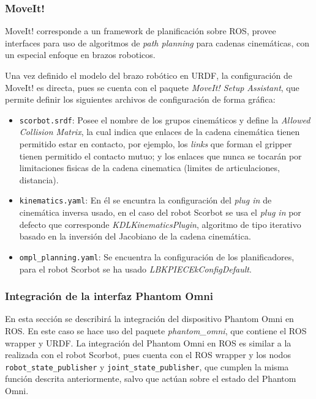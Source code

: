 \subsubsection{MoveIt!}

MoveIt! corresponde a un framework de planificación sobre ROS, provee interfaces para uso de algoritmos de \textit{path planning} para cadenas cinemáticas, con un especial enfoque en brazos roboticos.

Una vez definido el modelo del brazo robótico en URDF, la configuración de MoveIt! es directa, pues se cuenta con el paquete \textit{MoveIt! Setup Assistant}, que permite definir los siguientes archivos de configuración de forma gráfica:

\begin{itemize}
\item \texttt{scorbot.srdf}: Posee el nombre de los grupos cinemáticos y define la \textit{Allowed Collision Matrix}, la cual indica que enlaces de la cadena cinemática tienen permitido estar en contacto, por ejemplo, los \textit{links} que forman el gripper tienen permitido el contacto mutuo; y los enlaces que nunca se tocarán por limitaciones fisicas de la cadena cinematica (limites de articulaciones, distancia).

\item \texttt{kinematics.yaml}: En él se encuntra la configuración del \textit{plug in} de cinemática inversa usado, en el caso del robot Scorbot se usa el \textit{plug in} por defecto que corresponde \textit{KDLKinematicsPlugin}, algoritmo de tipo iterativo basado en la inversión del Jacobiano de la cadena cinemática.

\item \texttt{ompl\_planning.yaml}: Se encuentra la configuración de los planificadores, para el robot Scorbot se ha usado \textit{LBKPIECEkConfigDefault}. 

\end{itemize}

\subsubsection{Integración de la interfaz Phantom Omni}

En esta sección se describirá la integración del dispositivo Phantom Omni en ROS. En este caso se hace uso del paquete \textit{phantom\_omni}\cite{phantom_git}, que contiene el ROS wrapper y URDF. La integración del Phantom Omni en ROS es similar a la realizada con el robot Scorbot, pues cuenta con el  ROS wrapper y los nodos \texttt{robot\_state\_publisher} y  \texttt{joint\_state\_publisher}, que cumplen la misma función descrita anteriormente, salvo que actúan sobre el estado del Phantom Omni.

